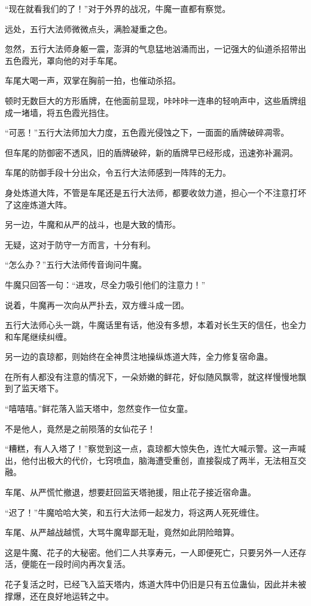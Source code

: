 \begin{this_body}
“现在就看我们的了！”对于外界的战况，牛魔一直都有察觉。

远处，五行大法师微微点头，满脸凝重之色。

忽然，五行大法师身躯一震，澎湃的气息猛地汹涌而出，一记强大的仙道杀招带出五色霞光，罩向他的对手车尾。

车尾大喝一声，双掌在胸前一拍，也催动杀招。

顿时无数巨大的方形盾牌，在他面前显现，咔咔咔一连串的轻响声中，这些盾牌组成一堵墙，将五色霞光挡住。

“可恶！”五行大法师加大力度，五色霞光侵蚀之下，一面面的盾牌破碎凋零。

但车尾的防御密不透风，旧的盾牌破碎，新的盾牌早已经形成，迅速弥补漏洞。

车尾的防御手段十分出众，令五行大法师感到一阵阵的无力。

身处炼道大阵，不管是车尾还是五行大法师，都要收敛力道，担心一个不注意打坏了这座炼道大阵。

另一边，牛魔和从严的战斗，也是大致的情形。

无疑，这对于防守一方而言，十分有利。

“怎么办？”五行大法师传音询问牛魔。

牛魔只回答一句：“进攻，尽全力吸引他们的注意力！”

说着，牛魔再一次向从严扑去，双方缠斗成一团。

五行大法师心头一跳，牛魔话里有话，他没有多想，本着对长生天的信任，也全力和车尾继续纠缠。

另一边的袁琼都，则始终在全神贯注地操纵炼道大阵，全力修复宿命蛊。

在所有人都没有注意的情况下，一朵娇嫩的鲜花，好似随风飘零，就这样慢慢地飘到了监天塔下。

“嘻嘻嘻。”鲜花落入监天塔中，忽然变作一位女童。

不是他人，竟然是之前陨落的女仙花子！

“糟糕，有人入塔了！”察觉到这一点，袁琼都大惊失色，连忙大喊示警。这一声喊出，他付出极大的代价，七窍喷血，脑海遭受重创，直接裂成了两半，无法相互交融。

车尾、从严慌忙撤退，想要赶回监天塔驰援，阻止花子接近宿命蛊。

“迟了！”牛魔哈哈大笑，和五行大法师一起发力，将这两人死死缠住。

车尾、从严越战越慌，大骂牛魔卑鄙无耻，竟然如此阴险暗算。

这是牛魔、花子的大秘密。他们二人共享寿元，一人即便死亡，只要另外一人还存活，便能在一段时间内再次复活。

花子复活之时，已经飞入监天塔内，炼道大阵中仍旧是只有五位蛊仙，因此并未被撑爆，还在良好地运转之中。


\end{this_body}
